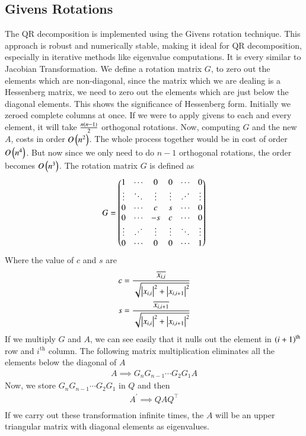 \documentclass[a4paper,12pt]{article}
\theoremstyle{remark}
\begin{document}
\subsection{Givens Rotations}
The QR decomposition is implemented using the Givens rotation technique. This approach is robust and numerically stable, making it ideal for QR decomposition, especially in iterative methods like eigenvalue computations. It is every similar to Jacobian Transformation. We define a rotation matrix $G$, to zero out the elements which are non-diagonal, since the matrix which we are dealing is a Hessenberg matrix, we need to zero out the elements which are just below the diagonal elements. This shows the significance of Hessenberg form. Initially we zeroed complete columns at once. If we were to apply givens to each and every element, it will take $\frac{n\left(n-1\right)}{2}$ orthogonal rotations. Now, computing $G$ and the new $A$, costs in order $O\left(n^2\right)$. The whole process together would be in cost of order $O\left(n^4\right)$. But now since we only need to do $n-1$ orthogonal rotations, the order becomes $O\left(n^3\right)$. The rotation matrix $G$ is defined as 
\begin{align}
G = \myvec{
1 & \cdots & 0 & 0 & \cdots & 0 \\
\vdots & \ddots & \vdots & \vdots & \reflectbox{$\ddots$} & \vdots \\
0 & \cdots & c & s & \cdots & 0\\
0 & \cdots & -s & c & \cdots & 0\\
\vdots & \reflectbox{$\ddots$} & \vdots & \vdots & \ddots & \vdots\\
0 & \cdots & 0 & 0 & \cdots & 1
}
\end{align}
Where the value of $c$ and $s$ are
\begin{align}
	c = \frac{\overline{x_{i,i}}}{\sqrt{\left\vert x_{i,i}\right\vert^2+\left\vert x_{i,i+1}\right\vert^2}}\\
	s = \frac{\overline{x_{i,i+1}}}{\sqrt{\left\vert x_{i,i}\right\vert^2+\left\vert x_{i,i+1}\right\vert^2}}
\end{align}
If we multiply $G$ and $A$, we can see easily that it nulls out the element in $\left(i+1\right)^{\text{th}}$ row and $i^\text{th}$ column. The following matrix multiplication eliminates all the elements below the diagonal of $A$
\begin{align}
	A \implies G_nG_{n-1}\cdots G_2G_1A
\end{align}
Now, we store $G_nG_{n-1}\cdots G_2G_1$ in $Q$ and then
\begin{align}
	A^\prime \implies QAQ^\top\\
\end{align}
If we carry out these transformation infinite times, the $A$ will be an upper triangular matrix with diagonal elements as eigenvalues.
\end{document}
